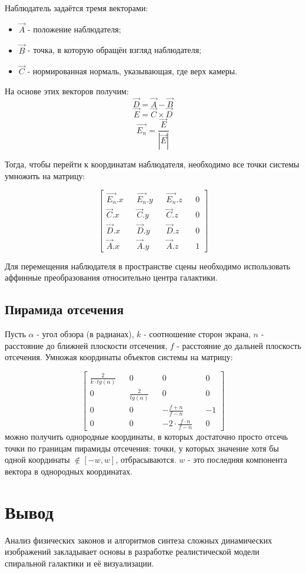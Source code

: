 Наблюдатель задаётся тремя векторами:
\begin{itemize}
    \item $\vec{A}$ - положение наблюдателя;
    \item $\vec{B}$ - точка, в которую обращён взгляд наблюдателя;
    \item $\vec{C}$ - нормированная нормаль, указывающая, где верх камеры.
\end{itemize}
На основе этих векторов получим:
\begin{equation}
    \vec{D} = \vec{A} - \vec{B}
\end{equation}
\begin{equation}
    \vec{E} = \vec{C} \times{} \vec{D}
\end{equation}
\begin{equation}
    \vec{E_n} = \frac{\vec{E}}{|\vec{E}|}
\end{equation}

Тогда, чтобы перейти к координатам наблюдателя, необходимо все точки системы умножить на матрицу\cite{camera}:

\begin{equation}
    \begin{bmatrix}
        \vec{E_n}.x && \vec{E_n}.y && \vec{E_n}.z && 0 \\
        \vec{C}.x  &&  \vec{C}.y  &&  \vec{C}.z  &&  0 \\
        \vec{D}.x  &&  \vec{D}.y  &&  \vec{D}.z  &&  0 \\
        \vec{A}.x  &&  \vec{A}.y  &&  \vec{A}.z  &&  1
    \end{bmatrix}
\end{equation}

Для перемещения наблюдателя в пространстве сцены необходимо использовать аффинные преобразования относительно центра галактики.

\subsection{Пирамида отсечения}

Пусть $\alpha{}$ - угол обзора (в радианах), $k$ - соотношение сторон экрана, $n$ - расстояние до ближней плоскости отсечения, $f$ - расстояние до дальней плоскость отсечения. Умножая координаты объектов системы на матрицу\cite{projection}:

\begin{equation}
    \begin{bmatrix}
        \frac{2}{k \cdot{} tg(\alpha{})} && 0 && 0 && 0 \\
        0 && \frac{2}{tg(\alpha{})} && 0 && 0 \\
        0 && 0 && -\frac{f + n}{f - n} && -1 \\
        0 && 0 && -2\cdot{}\frac{f\cdot{}n}{f - n} && 0
    \end{bmatrix}
\end{equation}
можно получить однородные координаты, в которых достаточно просто отсечь точки по границам пирамиды отсечения: точки, у которых значение хотя бы одной координаты $\notin [-w, w]$, отбрасываются. $w$ - это последняя компонента вектора в однородных координатах.

\section{Вывод}
Анализ физических законов и алгоритмов синтеза сложных динамических изображений закладывает основы в разработке реалистической модели спиральной галактики и её визуализации.


